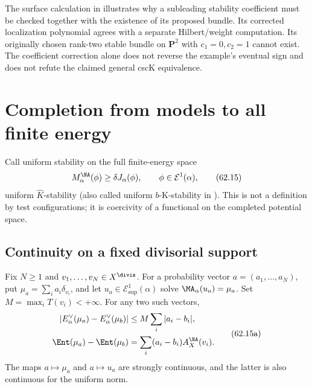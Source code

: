 The surface calculation in
 illustrates why a
subleading stability coefficient must be checked together with
the existence of its proposed bundle. Its corrected localization
polynomial agrees with a separate Hilbert/weight computation.
Its originally chosen rank-two stable bundle on $\mathbf P^2$
with $c_1=0,c_2=1$ cannot exist. The coefficient correction
alone does not reverse the example's eventual sign and does
not refute the claimed general cscK equivalence.

\section{Completion from models to all finite energy}
\label{sec:mpwn-k-completion}

Call uniform stability on the full finite-energy space
\[
 M_\alpha^{\NA}(\phi)\geq\delta J_\alpha(\phi),
 \qquad\phi\in\mathcal E^1(\alpha),
\tag{62.15}\label{eq:mpwn-bk-stability}
\]
uniform $\widehat K$-stability (also called uniform
$b$-K-stability in \cite{MP24,MPWN25}).  This is not a definition by
test configurations; it is coercivity of a functional on the completed
potential space.

\subsection{Continuity on a fixed divisorial support}
\label{subsec:mpwn-k-finite-support}

\begin{proposition}
\label{prop:mpwn-finite-mass-continuity}
Fix $N\geq1$ and $v_1,\ldots,v_N\in X^{\divis}$. For a probability vector
$a=(a_1,\ldots,a_N)$, put $\mu_a=\sum_i a_i\delta_{v_i}$, and let
$u_a\in\mathcal E^1_{\sup}(\alpha)$ solve $\MA_\alpha(u_a)=\mu_a$.
Set $M=\max_iT(v_i)<+\infty$. For any two such vectors,
\[
 \begin{aligned}
 |E_\alpha^\vee(\mu_a)-E_\alpha^\vee(\mu_b)|
       &\leq M\sum_i|a_i-b_i|,\\
 \Ent(\mu_a)-\Ent(\mu_b)
       &=\sum_i(a_i-b_i)A_X^{\NA}(v_i).
 \end{aligned}
\tag{62.15a}\label{eq:mpwn-finite-mass-continuity}
\]
The maps $a\mapsto\mu_a$ and $a\mapsto u_a$ are strongly continuous,
and the latter is also continuous for the uniform norm.
\end{proposition}

